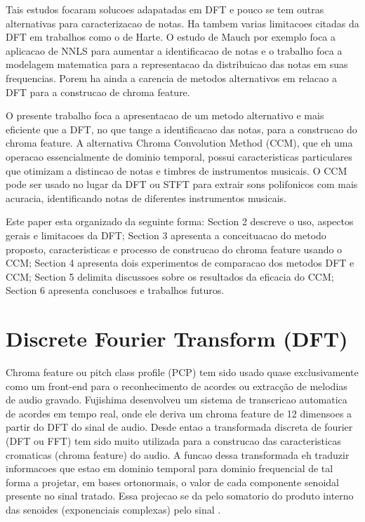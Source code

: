 \documentclass{article}
\begin{document}
	Tais estudos focaram solucoes adapatadas em DFT e pouco se tem outras alternativas para caracterizacao de notas. Ha tambem varias limitacoes citadas da DFT em trabalhos como o de Harte\cite{harte2010towards}. O estudo de Mauch\cite{mauch2010approximate} por exemplo foca a aplicacao de NNLS para aumentar a identificacao de notas e o trabalho \cite{wakefield1999mathematical} foca a modelagem matematica	para a representacao da distribuicao das notas em suas frequencias. Porem ha ainda a carencia de metodos alternativos em relacao a DFT para a construcao de chroma feature.

	O presente trabalho foca a apresentacao de um metodo alternativo e mais eficiente que a DFT, no que tange a identificacao das notas, para a construcao do chroma feature. A alternativa Chroma Convolution Method (CCM), que eh uma operacao essencialmente de dominio temporal, possui caracteristicas particulares que otimizam a distincao de notas e timbres de instrumentos musicais. O CCM pode ser usado no lugar da DFT ou STFT para extrair sons polifonicos com mais acuracia, identificando notas de diferentes instrumentos musicais.

	Este paper esta organizado da seguinte forma: Section 2 descreve o uso, aspectos gerais e limitacoes da DFT; Section 3 apresenta a conceituacao do metodo proposto, caracteristicas e processo de construcao do chroma feature usando o CCM; Section 4 apresenta dois experimentos de comparacao dos metodos DFT e CCM; Section 5 delimita discussoes sobre os resultados da eficacia do CCM; Section 6 apresenta conclusoes e trabalhos futuros.

\section{Discrete Fourier Transform (DFT)}\label{sec:sfft}

	Chroma feature ou pitch class profile (PCP) tem sido usado quase exclusivamente como um front-end para o
	reconhecimento de acordes ou extracção de melodias de audio gravado. Fujishima \cite{fujishima1999realtime} desenvolveu um sistema de transcricao automatica de acordes em tempo real, onde ele deriva um chroma feature de 12 dimensoes a partir do DFT do sinal de audio. Desde entao a transformada discreta de fourier (DFT ou  FFT) tem sido muito utilizada para a construcao das caracteristicas cromaticas (chroma feature) do audio. A funcao dessa transformada eh traduzir informacoes que estao em dominio temporal para dominio frequencial de tal forma a projetar, em bases ortonormais, o valor de cada componente senoidal presente no sinal tratado. Essa projecao se da pelo somatorio do produto interno das senoides (exponenciais complexas) pelo sinal \cite{vaidyanathan1993multirate}.
\end{document}

